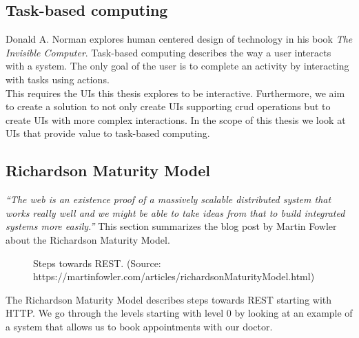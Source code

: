 \subsection{Task-based computing}
Donald A. Norman explores human centered design of technology in his book \textit{The Invisible Computer}. Task-based computing describes the way a user interacts with a system. The only goal of the user is to complete an activity by interacting with tasks using actions. \citep{invisiblecomputer} \\
This requires the UIs this thesis explores to be interactive. Furthermore, we aim to create a solution to not only create UIs supporting \gls{crud} operations but to create UIs with more complex interactions. In the scope of this thesis we look at UIs that provide value to task-based computing.

\subsection{Richardson Maturity Model}\label{richardsonmaturitymodel}
\textit{``The web is an existence proof of a massively scalable distributed system that works really well and we might be able to take ideas from that to build integrated systems more easily.''} \citep{richardsonmaturitymodel} This section summarizes the blog post by Martin Fowler about the Richardson Maturity Model.

\begin{figure}[!htb]
  \caption{Steps towards REST. (Source: https://martinfowler.com/articles/richardsonMaturityModel.html)}
\end{figure}

The Richardson Maturity Model describes steps towards REST starting with HTTP. We go through the levels starting with level 0 by looking at an example of a system that allows us to book appointments with our doctor.

